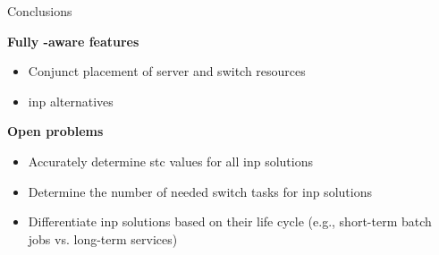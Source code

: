 \begin{frame}{Conclusions}


    \vspace{7mm}

    \textbf{Fully \texorpdfstring{}{INP}-aware \texorpdfstring{}{RM} features}\\
    \begin{itemize}
        \item Conjunct placement of server and switch resources
        \item \gls*{inp} alternatives 
    \end{itemize}

    \vspace{3mm}

    \textbf{Open problems}\\
    \begin{itemize}
        \item Accurately determine \gls*{stc} values for all \gls*{inp} solutions
        \item Determine the number of needed switch tasks for \gls*{inp} solutions
        \item Differentiate \gls*{inp} solutions based on their life cycle (e.g., short-term batch jobs vs. long-term services)
    \end{itemize}

\end{frame}

